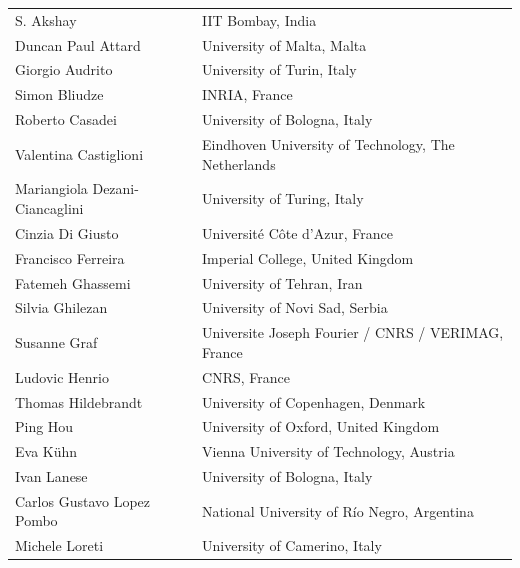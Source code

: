 \documentclass[]{llncs}
\begin{document}
\begin{longtable}{p{}p{}}
S. Akshay & IIT Bombay, India\\

Duncan Paul Attard & University of Malta, Malta\\

Giorgio Audrito & University of Turin, Italy\\

Simon Bliudze & INRIA, France\\

Roberto Casadei & University of Bologna, Italy\\

Valentina Castiglioni & Eindhoven University of Technology, The Netherlands\\

Mariangiola Dezani-Ciancaglini & University of Turing, Italy\\

Cinzia Di Giusto & Universit\'e C\^ote d'Azur, France\\

Francisco Ferreira & Imperial College, United Kingdom\\

Fatemeh Ghassemi & University of Tehran, Iran\\

Silvia Ghilezan & University of Novi Sad, Serbia\\

Susanne Graf & Universite Joseph Fourier / CNRS / VERIMAG, France\\

Ludovic Henrio & CNRS, France\\

Thomas Hildebrandt & University of Copenhagen, Denmark\\

Ping Hou & University of Oxford, United Kingdom\\

Eva K\"uhn & Vienna University of Technology, Austria\\

Ivan Lanese & University of Bologna, Italy\\

Carlos Gustavo Lopez Pombo & National University of Río Negro, Argentina\\

Michele Loreti & University of Camerino, Italy\\



\end{longtable}
\end{document}
